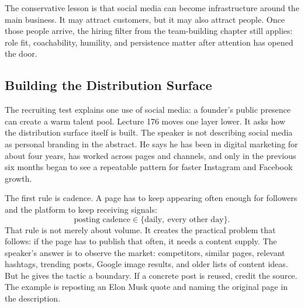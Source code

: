 \documentclass[11pt,oneside]{book}
\begin{document}
The conservative lesson is that social media can become infrastructure around the main business. It may attract customers, but it may also attract people. Once those people arrive, the hiring filter from the team-building chapter still applies: role fit, coachability, humility, and persistence matter after attention has opened the door.


\subsection{Building the Distribution Surface}

The recruiting test explains one use of social media: a founder's public presence can create a warm talent pool. Lecture 176 moves one layer lower. It asks how the distribution surface itself is built. The speaker is not describing social media as personal branding in the abstract. He says he has been in digital marketing for about four years, has worked across pages and channels, and only in the previous six months began to see a repeatable pattern for faster Instagram and Facebook growth.

The first rule is cadence. A page has to keep appearing often enough for followers and the platform to keep receiving signals:
\[
\text{posting cadence}
\in
\{\text{daily},\ \text{every other day}\}.
\]
That rule is not merely about volume. It creates the practical problem that follows: if the page has to publish that often, it needs a content supply. The speaker's answer is to observe the market: competitors, similar pages, relevant hashtags, trending posts, Google image results, and older lists of content ideas. But he gives the tactic a boundary. If a concrete post is reused, credit the source. The example is reposting an Elon Musk quote and naming the original page in the description.
\end{document}
